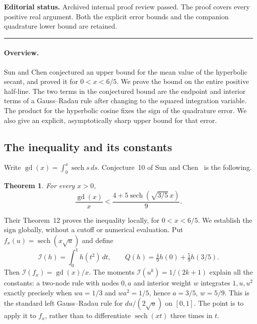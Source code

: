 \documentclass[11pt,a4paper]{article}
\newtheorem{SourceRcfMtheorem}{Theorem}
\begin{document}
\noindent\textbf{Editorial status.} Archived internal proof review passed. The proof covers every positive real argument. Both the explicit error bounds and the companion quadrature lower bound are retained.

\smallskip\hrule\medskip



\begingroup
\newcommand{\sech}{\operatorname{sech}}
\newcommand{\gd}{\operatorname{gd}}



\newcommand{\I}{\mathcal I}
\setcounter{equation}{0}
\renewcommand{\theequation}{\thesection.\arabic{equation}}
\renewcommand{\theHequation}{R25M.\arabic{equation}}
\paragraph{Overview.}
Sun and Chen conjectured an upper bound for the mean value of the
hyperbolic secant, and proved it for $0<x<6/5$. We prove the bound
on the entire positive half-line. The two terms in the conjectured
bound are the endpoint and interior terms of a Gauss--Radau rule
after changing to the squared integration variable. The product
for the hyperbolic cosine fixes the sign of the quadrature error.
We also give an explicit, asymptotically sharp upper bound for that error.


\subsection{The inequality and its constants}
Write $\gd(x)=\int_0^x\sech s\,ds$.
Conjecture~10 of Sun and Chen~\cite[p.\,142, (28)]{R22S:SC} is the following.
\begin{SourceRcfMtheorem}\label{R25M:thm}
For every $x>0$,
\[
  \frac{\gd(x)}{x}<\frac{4+5\sech(\sqrt{3/5}\,x)}{9}.
\]
\end{SourceRcfMtheorem}
Their Theorem~12 proves the inequality locally, for $0<x<6/5$.
We establish the sign globally, without a cutoff or numerical
evaluation. Put $f_x(u)=\sech(x\sqrt{u})$ and define
\[
 \I(h)=\int_0^1 h(t^2)\,dt,\qquad
 Q(h)=\tfrac49 h(0)+\tfrac59 h(3/5).
\]
Then $\I(f_x)=\gd(x)/x$. The moments $\I(u^k)=1/(2k+1)$
explain all the constants: a two-node rule with nodes $0,a$ and
interior weight $w$ integrates $1,u,u^2$ exactly precisely when
$wa=1/3$ and $wa^2=1/5$, hence $a=3/5$, $w=5/9$. This
is the standard left Gauss--Radau rule for $du/(2\sqrt{u})$ on
$[0,1]$. The point is to apply it to $f_x$, rather than to
differentiate $\sech(xt)$ three times in $t$.
\end{document}
